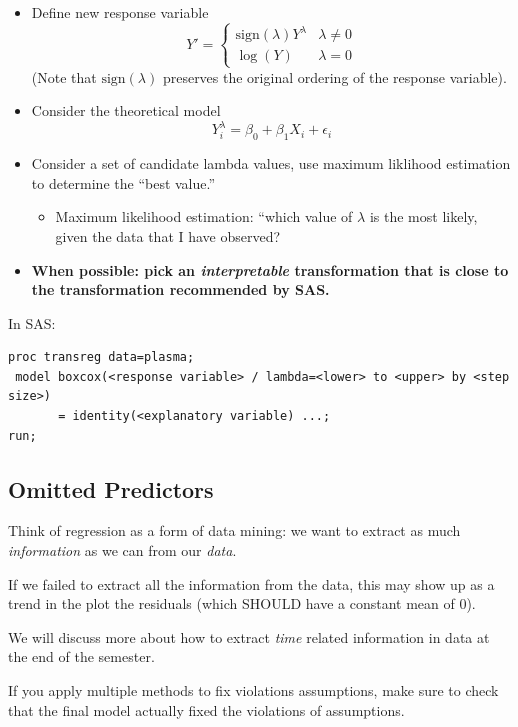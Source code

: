 \documentclass[12pt]{notes}
\begin{document}
\begin{itemize}
\item Define new response variable 
\[Y' = 
\begin{cases} 
\text{sign}(\lambda)Y^\lambda & \lambda \ne 0 \\
\log(Y) & \lambda = 0
\end{cases}
\]
(Note that $\text{sign}(\lambda)$ preserves the original ordering of the response variable). 
\item Consider the theoretical model
\[Y_i^\lambda = \beta_0 + \beta_1X_i + \epsilon_i\]
\item Consider a set of candidate lambda values, use maximum liklihood estimation to determine the ``best value.''
\begin{itemize}
\item Maximum likelihood estimation: ``which value of $\lambda$ is the most likely, given the data that I have observed?
\end{itemize}
\item \textbf{When possible: pick an \textit{interpretable} transformation that is close to the transformation recommended by SAS.}

\begin{minipage}[l][1cm][c]{\textwidth}
\end{minipage}

\end{itemize}

In SAS:
\begin{verbatim}
proc transreg data=plasma;
 model boxcox(<response variable> / lambda=<lower> to <upper> by <step size>) 
       = identity(<explanatory variable) ...;
run;
\end{verbatim}

\subsection*{Omitted Predictors}
Think of regression as a form of data mining: we want to extract as much \textit{information} as we can from our \textit{data}.

\nspace
If we failed to extract all the information from the data, this may show up as a trend in the plot the residuals (which SHOULD have a constant mean of 0). 

\nspace
We will discuss more about how to extract \textit{time} related information in data at the end of the semester. 

\nspace
If you apply multiple methods to fix violations assumptions, make sure to check that the final model actually fixed the violations of assumptions. 
















\end{document}
